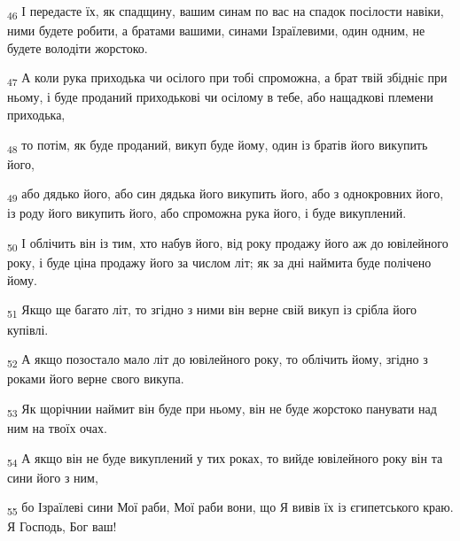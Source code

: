\begin{tcolorbox}
\textsubscript{46} І передасте їх, як спадщину, вашим синам по вас на спадок посілости навіки, ними будете робити, а братами вашими, синами Ізраїлевими, один одним, не будете володіти жорстоко.
\end{tcolorbox}
\begin{tcolorbox}
\textsubscript{47} А коли рука приходька чи осілого при тобі спроможна, а брат твій збідніє при ньому, і буде проданий приходькові чи осілому в тебе, або нащадкові племени приходька,
\end{tcolorbox}
\begin{tcolorbox}
\textsubscript{48} то потім, як буде проданий, викуп буде йому, один із братів його викупить його,
\end{tcolorbox}
\begin{tcolorbox}
\textsubscript{49} або дядько його, або син дядька його викупить його, або з однокровних його, із роду його викупить його, або спроможна рука його, і буде викуплений.
\end{tcolorbox}
\begin{tcolorbox}
\textsubscript{50} І облічить він із тим, хто набув його, від року продажу його аж до ювілейного року, і буде ціна продажу його за числом літ; як за дні наймита буде полічено йому.
\end{tcolorbox}
\begin{tcolorbox}
\textsubscript{51} Якщо ще багато літ, то згідно з ними він верне свій викуп із срібла його купівлі.
\end{tcolorbox}
\begin{tcolorbox}
\textsubscript{52} А якщо позостало мало літ до ювілейного року, то облічить йому, згідно з роками його верне свого викупа.
\end{tcolorbox}
\begin{tcolorbox}
\textsubscript{53} Як щорічнии наймит він буде при ньому, він не буде жорстоко панувати над ним на твоїх очах.
\end{tcolorbox}
\begin{tcolorbox}
\textsubscript{54} А якщо він не буде викуплений у тих роках, то вийде ювілейного року він та сини його з ним,
\end{tcolorbox}
\begin{tcolorbox}
\textsubscript{55} бо Ізраїлеві сини Мої раби, Мої раби вони, що Я вивів їх із єгипетського краю. Я Господь, Бог ваш!
\end{tcolorbox}
